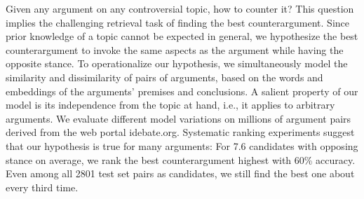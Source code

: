 Given any argument on any controversial topic, how to counter it? This question implies the challenging retrieval task of finding the best counterargument. Since prior knowledge of a topic cannot be expected in general, we hypothesize the best counterargument to invoke the same aspects as the argument while having the opposite stance. To operationalize our hypothesis, we simultaneously model the similarity and dissimilarity of pairs of arguments, based on the words and embeddings of the arguments' premises and conclusions. A salient property of our model is its independence from the topic at hand, i.e., it applies to arbitrary arguments. We evaluate different model variations on millions of argument pairs derived from the web portal idebate.org. Systematic ranking experiments suggest that our hypothesis is true for many arguments: For 7.6 candidates with opposing stance on average, we rank the best counterargument highest with 60\% accuracy. Even among all 2801 test set pairs as candidates, we still find the best one about every third time.
